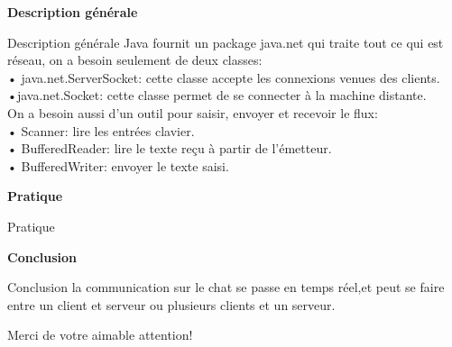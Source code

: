 \documentclass[11pt]{beamer}
\begin{document}
\begin{frame}{\textbf {Description générale}}
          
         \begin{block}{Description générale}
         \large
Java fournit un package java.net qui traite tout ce qui est réseau, on a besoin seulement de deux classes:\\

   • java.net.ServerSocket: cette classe accepte les connexions venues des clients.\\
    •java.net.Socket: cette classe permet de se connecter à la machine distante.\\

On a besoin aussi d'un outil pour saisir, envoyer et recevoir le flux:\\

   • Scanner: lire les entrées clavier.\\
   • BufferedReader: lire le texte reçu à partir de l'émetteur.\\
   • BufferedWriter: envoyer le texte saisi.\\


\end{block}                      
             
   \end{frame} 		
   
 \begin{frame}{\textbf {Pratique}}
          
         \begin{block}{Pratique}

    
\end{block}                      
             
   \end{frame}    
   		
			
			 
   
			
   
 
   
   \begin{frame}{\textbf {Conclusion}}
  
   \begin{block}{Conclusion}
   \Large
la communication sur le chat se passe en temps réel,et peut se faire entre un client et serveur ou plusieurs clients et un serveur.
   \end{block}                      
             
   \end{frame}
   
     
   
    \begin{frame}{\textbf {}}
  
   \begin{block}{}
   \begin{center}
   Merci de votre aimable attention!
 
   \end{center}

    
    
    
   \end{block}                      
             
   \end{frame} 
   
   
\end{document}
